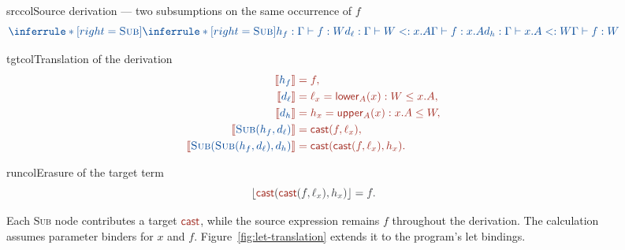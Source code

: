 \begin{figure}[!htbp]
\begin{examplepanel}{srccol}{Source derivation --- two subsumptions on the same occurrence of \(f\)}
\small
{}
\[
\src{
\inferrule*[right=\textsc{Sub}]{
 \inferrule*[right=\textsc{Sub}]{
 h_f:\Gamma\vdash f:W\\
 d_\ell:\Gamma\vdash W<:x.A
 }{\Gamma\vdash f:x.A}\\
 d_h:\Gamma\vdash x.A<:W
}{\Gamma\vdash f:W}}
\]
\end{examplepanel}
\begin{examplepanel}{tgtcol}{Translation of the derivation}
\[
\tgt{
\begin{aligned}
 \tr{h_f}&=f,\\
 \tr{d_\ell}&=\ell_x=\ev{lower}_A(x):W\le x.A,\\
 \tr{d_h}&=h_x=\ev{upper}_A(x):x.A\le W,\\
 \tr{\textsc{Sub}(h_f,d_\ell)}&=\cast{f}{\ell_x},\\
 \tr{\textsc{Sub}(\textsc{Sub}(h_f,d_\ell),d_h)}
   &=\cast{\cast{f}{\ell_x}}{h_x}.
\end{aligned}}
\]
\end{examplepanel}
\begin{examplepanel}{runcol}{Erasure of the target term}
\[
\run{\erase{\cast{\cast{f}{\ell_x}}{h_x}}=f.}
\]
\end{examplepanel}
\caption{Each \textsc{Sub} node contributes a target \(\ev{cast}\),
while the source expression remains \(f\) throughout the derivation.
The calculation assumes parameter binders for \(x\) and \(f\).
Figure~\ref{fig:let-translation} extends it to the program's let bindings.}
\label{fig:derivation}
\end{figure}
